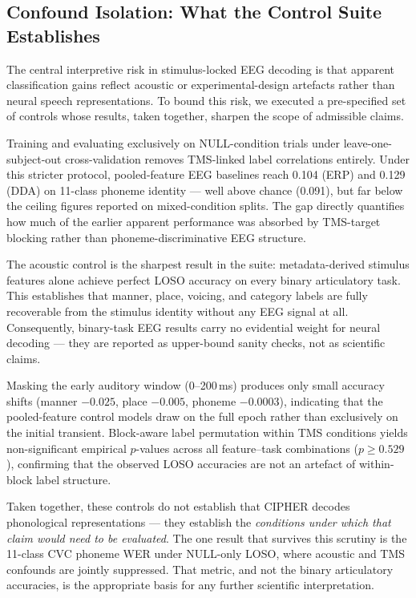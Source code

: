 \documentclass[11pt,a4paper]{article}
\begin{document}
\subsection{Confound Isolation: What the Control Suite Establishes}

The central interpretive risk in stimulus-locked EEG decoding is that
apparent classification gains reflect acoustic or experimental-design
artefacts rather than neural speech representations. To bound this risk,
we executed a pre-specified set of controls whose results, taken together,
sharpen the scope of admissible claims.

Training and evaluating exclusively on NULL-condition trials under
leave-one-subject-out cross-validation removes TMS-linked label
correlations entirely. Under this stricter protocol, pooled-feature EEG
baselines reach 0.104 (ERP) and 0.129 (DDA) on 11-class phoneme identity
--- well above chance (0.091), but far below the ceiling figures reported
on mixed-condition splits. The gap directly quantifies how much of the
earlier apparent performance was absorbed by TMS-target blocking rather
than phoneme-discriminative EEG structure.

The acoustic control is the sharpest result in the suite: metadata-derived
stimulus features alone achieve perfect LOSO accuracy on every binary
articulatory task. This establishes that manner, place, voicing, and
category labels are fully recoverable from the stimulus identity without
any EEG signal at all. Consequently, binary-task EEG results carry no
evidential weight for neural decoding --- they are reported as
upper-bound sanity checks, not as scientific claims.

Masking the early auditory window (0--200\,ms) produces only small
accuracy shifts (manner $-0.025$, place $-0.005$, phoneme $-0.0003$),
indicating that the pooled-feature control models draw on the full epoch
rather than exclusively on the initial transient. Block-aware label
permutation within TMS conditions yields non-significant empirical
$p$-values across all feature--task combinations ($p \geq 0.529$),
confirming that the observed LOSO accuracies are not an artefact of
within-block label structure.

Taken together, these controls do not establish that CIPHER decodes
phonological representations --- they establish the \emph{conditions
under which that claim would need to be evaluated}. The one result that
survives this scrutiny is the 11-class CVC phoneme WER under NULL-only
LOSO, where acoustic and TMS confounds are jointly suppressed. That
metric, and not the binary articulatory accuracies, is the appropriate
basis for any further scientific interpretation.
\end{document}
